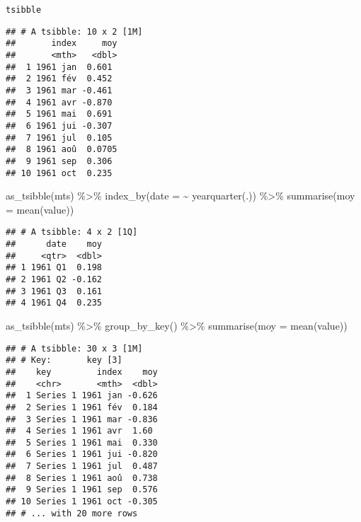 \documentclass[10pt,xcolor=table,color={dvipsnames,usenames},ignorenonframetext,usepdftitle=false,french]{beamer}
\newenvironment{Shaded}{\begin{snugshade}}{\end{snugshade}}
\newcommand{\AttributeTok}[1]{\textcolor[rgb]{0.77,0.63,0.00}{#1}}
\newcommand{\FunctionTok}[1]{\textcolor[rgb]{0.00,0.00,0.00}{#1}}
\newcommand{\NormalTok}[1]{#1}
\newcommand{\SpecialCharTok}[1]{\textcolor[rgb]{0.00,0.00,0.00}{#1}}
\begin{document}
\begin{frame}{\texttt{tsibble}}
\begin{verbatim}
## # A tsibble: 10 x 2 [1M]
##       index     moy
##       <mth>   <dbl>
##  1 1961 jan  0.601 
##  2 1961 fév  0.452 
##  3 1961 mar -0.461 
##  4 1961 avr -0.870 
##  5 1961 mai  0.691 
##  6 1961 jui -0.307 
##  7 1961 jul  0.105 
##  8 1961 aoû  0.0705
##  9 1961 sep  0.306 
## 10 1961 oct  0.235
\end{verbatim}

\begin{Shaded}
\begin{Highlighting}[]
\FunctionTok{as\_tsibble}\NormalTok{(mts) }\SpecialCharTok{\%\textgreater{}\%}  
    \FunctionTok{index\_by}\NormalTok{(}\AttributeTok{date =} \SpecialCharTok{\textasciitilde{}} \FunctionTok{yearquarter}\NormalTok{(.)) }\SpecialCharTok{\%\textgreater{}\%} 
    \FunctionTok{summarise}\NormalTok{(}\AttributeTok{moy =} \FunctionTok{mean}\NormalTok{(value))}
\end{Highlighting}
\end{Shaded}

\begin{verbatim}
## # A tsibble: 4 x 2 [1Q]
##      date    moy
##     <qtr>  <dbl>
## 1 1961 Q1  0.198
## 2 1961 Q2 -0.162
## 3 1961 Q3  0.161
## 4 1961 Q4  0.235
\end{verbatim}

\begin{Shaded}
\begin{Highlighting}[]
\FunctionTok{as\_tsibble}\NormalTok{(mts) }\SpecialCharTok{\%\textgreater{}\%}  
    \FunctionTok{group\_by\_key}\NormalTok{() }\SpecialCharTok{\%\textgreater{}\%} 
    \FunctionTok{summarise}\NormalTok{(}\AttributeTok{moy =} \FunctionTok{mean}\NormalTok{(value))}
\end{Highlighting}
\end{Shaded}

\begin{verbatim}
## # A tsibble: 30 x 3 [1M]
## # Key:       key [3]
##    key         index    moy
##    <chr>       <mth>  <dbl>
##  1 Series 1 1961 jan -0.626
##  2 Series 1 1961 fév  0.184
##  3 Series 1 1961 mar -0.836
##  4 Series 1 1961 avr  1.60 
##  5 Series 1 1961 mai  0.330
##  6 Series 1 1961 jui -0.820
##  7 Series 1 1961 jul  0.487
##  8 Series 1 1961 aoû  0.738
##  9 Series 1 1961 sep  0.576
## 10 Series 1 1961 oct -0.305
## # ... with 20 more rows
\end{verbatim}
\end{frame}
\end{document}

